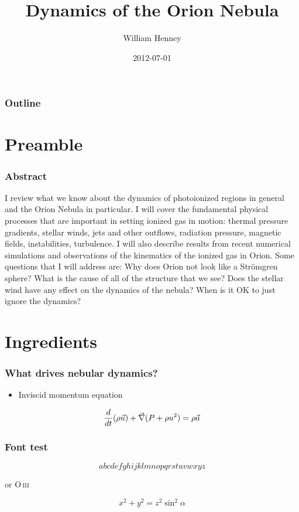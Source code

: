\documentclass[presentation]{beamer}
\title{Dynamics of the Orion Nebula}
\author{William Henney}
\date{2012-07-01}
\begin{document}
\maketitle

\begin{frame}
\frametitle{Outline}
\setcounter{tocdepth}{3}
\tableofcontents
\end{frame}





\section{Preamble}
\label{sec-1}
\begin{frame}
\frametitle{Abstract}
\label{sec-1-1}


I review what we know about the dynamics of photoionized regions in general and the Orion Nebula in particular.  I will cover the fundamental physical processes that are important in setting ionized gas in motion: thermal pressure gradients, stellar winds, jets and other outflows, radiation pressure, magnetic fields, instabilities, turbulence.  I will also describe results from recent numerical simulations and observations of the kinematics of the ionized gas in Orion.  Some questions that I will address are:  Why does Orion not look like a Strömgren sphere?  What is the cause of all of the structure that we see?  Does the stellar wind have any effect on the dynamics of the nebula?  When is it OK to just ignore the dynamics?
\end{frame}
\section{Ingredients}
\label{sec-2}
\begin{frame}
\frametitle{What drives nebular dynamics?}
\label{sec-2-1}


\begin{itemize}
\item Inviscid momentum equation
\end{itemize}
\[
\frac{d}{dt} ( \rho \vec{u} ) + \vec{\operatorname{\nabla}} ( P + \rho u^2 ) = \rho \vec{a} 
\]
\end{frame}
\begin{frame}
\frametitle{Font test}
\label{sec-2-2}


\[
abcdefghijklmnopqrstuvwxyz
\]

 or O\,\textsc{iii}

\[
x^2 + y^2 = z^2 \sin^2 \alpha
\]
\end{frame}
\end{document}
